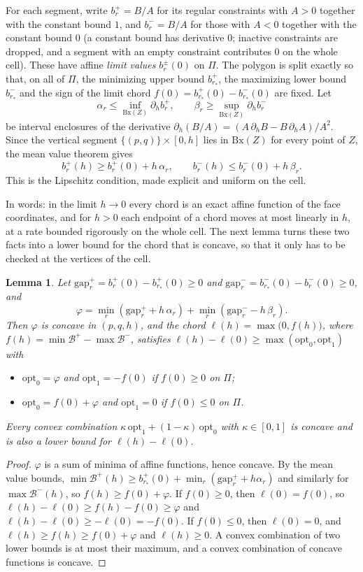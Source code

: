 \documentclass[11pt]{amsart}
\newtheorem{lemma}[theorem]{Lemma}
\theoremstyle{definition}
\theoremstyle{remark}
\newcommand{\gap}{\mathrm{gap}}
\newcommand{\opt}{\mathrm{opt}}
\begin{document}
For each segment, write $b_r^+=B/A$ for its regular constraints with $A>0$ together with the constant bound $1$, and
$b_r^-=B/A$ for those with $A<0$ together with the constant bound $0$ (a constant bound has derivative $0$; inactive
constraints are dropped, and a segment with an empty constraint contributes $0$ on the whole cell). These have affine
\emph{limit values} $b_r^\pm(0)$ on $\Pi$. The polygon is split
exactly so that, on all of $\Pi$, the minimizing upper bound $b_{r_*}^+$, the maximizing lower bound $b_{r_*}^-$ and
the sign of the limit chord $f(0)=b^+_{r_*}(0)-b^-_{r_*}(0)$ are fixed. Let
\[
\alpha_r\le\inf_{\mathrm{Bx}(Z)}\partial_h b_r^+,\qquad \beta_r\ge\sup_{\mathrm{Bx}(Z)}\partial_h b_r^-
\]
be interval enclosures of the derivative $\partial_h(B/A)=(A\,\partial_hB-B\,\partial_hA)/A^2$. Since the vertical
segment $\{(p,q)\}\times[0,h]$ lies in $\mathrm{Bx}(Z)$ for every point of $Z$, the mean value theorem gives
\[
b_r^+(h)\ge b_r^+(0)+h\,\alpha_r,\qquad b_r^-(h)\le b_r^-(0)+h\,\beta_r .
\]
This is the Lipschitz condition, made explicit and uniform on the cell.

In words: in the limit $h\to0$ every chord is an exact affine function of the face coordinates, and for $h>0$ each
endpoint of a chord moves at most linearly in $h$, at a rate bounded rigorously on the whole cell. The next lemma turns
these two facts into a lower bound for the chord that is concave, so that it only has to be checked at the vertices of
the cell.

\begin{lemma}\label{lem:concave}
Let $\gap^+_r=b_r^+(0)-b_{r_*}^+(0)\ge0$ and $\gap^-_r=b_{r_*}^-(0)-b_r^-(0)\ge0$, and
\[
\varphi=\min_r(\gap^+_r+h\,\alpha_r)+\min_r(\gap^-_r-h\,\beta_r).
\]
Then $\varphi$ is concave in $(p,q,h)$, and the chord $\ell(h)=\max\bigl(0,f(h)\bigr)$, where
$f(h)=\min\mathcal B^+-\max\mathcal B^-$, satisfies $\ell(h)-\ell(0)\ge\max(\opt_0,\opt_1)$ with
\begin{itemize}
\item $\opt_0=\varphi$ and $\opt_1=-f(0)$ if $f(0)\ge0$ on $\Pi$;
\item $\opt_0=f(0)+\varphi$ and $\opt_1=0$ if $f(0)\le0$ on $\Pi$.
\end{itemize}
Every convex combination $\kappa\,\opt_1+(1-\kappa)\,\opt_0$ with $\kappa\in[0,1]$ is concave and is also a lower
bound for $\ell(h)-\ell(0)$.
\end{lemma}

\begin{proof}
$\varphi$ is a sum of minima of affine functions, hence concave. By the mean value bounds,
$\min\mathcal B^+(h)\ge b^+_{r_*}(0)+\min_r(\gap^+_r+h\alpha_r)$ and similarly for $\max\mathcal B^-(h)$, so
$f(h)\ge f(0)+\varphi$. If $f(0)\ge0$, then $\ell(0)=f(0)$, so $\ell(h)-\ell(0)\ge f(h)-f(0)\ge\varphi$ and
$\ell(h)-\ell(0)\ge-\ell(0)=-f(0)$. If $f(0)\le0$, then $\ell(0)=0$, and $\ell(h)\ge f(h)\ge f(0)+\varphi$ and
$\ell(h)\ge0$. A convex combination of two lower bounds is at most their maximum, and a convex combination of
concave functions is concave.
\end{proof}
\end{document}

